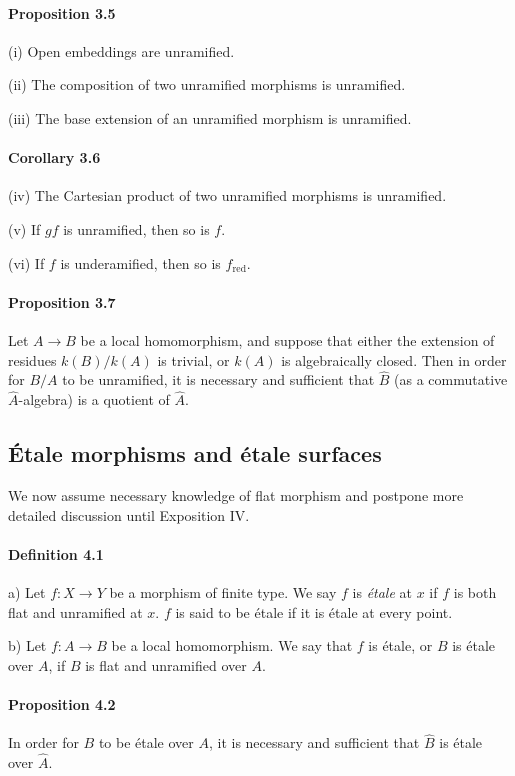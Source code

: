 \documentclass[11pt]{article}
\begin{document}
\paragraph{Proposition 3.5} (i) Open embeddings are unramified.

(ii) The composition of two unramified morphisms is unramified.

(iii) The base extension of an unramified morphism is unramified.

\paragraph{Corollary 3.6} (iv) The Cartesian product of two unramified morphisms is unramified.

(v) If $gf$ is unramified, then so is $f$.

(vi) If $f$ is underamified, then so is $f_{\mathrm{red}}$.

\paragraph{Proposition 3.7} Let $A\to B$ be a local homomorphism, and suppose that either the extension of residues $k(B)/k(A)$ is trivial, or $k(A)$ is algebraically closed. Then in order for $B/A$ to be unramified, it is necessary and sufficient that $\hat{B}$ (as a commutative $\hat{A}$-algebra) is a quotient of $\hat{A}$.

\subsection{Étale morphisms and étale surfaces}
We now assume necessary knowledge of flat morphism and postpone more detailed discussion until Exposition IV.

\paragraph{Definition 4.1} a) Let $f:X\to Y$ be a morphism of finite type. We say $f$ is \textit{étale} at $x$ if $f$ is both flat and unramified at $x$. $f$ is said to be étale if it is étale at every point.

b) Let $f:A\to B$ be a local homomorphism. We say that $f$ is étale, or $B$ is étale over $A$, if $B$ is flat and unramified over $A$.

\paragraph{Proposition 4.2} In order for $B$ to be étale over $A$, it is necessary and sufficient that $\hat{B}$ is étale over $\hat{A}$.
\end{document}
